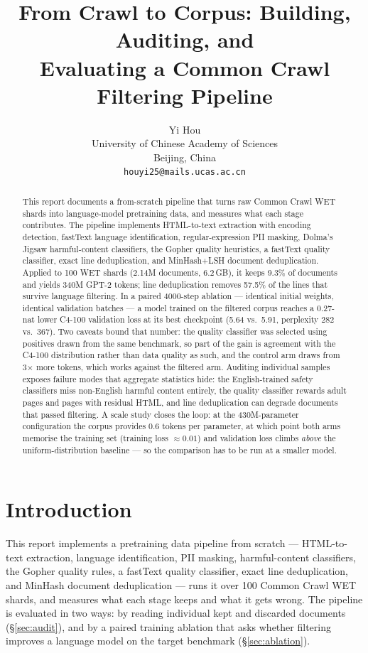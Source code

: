 \documentclass{article}
\title{From Crawl to Corpus: Building, Auditing, and\\
Evaluating a Common Crawl Filtering Pipeline}
\author{%
  Yi Hou \\
  University of Chinese Academy of Sciences\\
  Beijing, China \\
  \texttt{houyi25@mails.ucas.ac.cn}
}
\begin{document}
\maketitle

\begin{abstract}
This report documents a from-scratch pipeline that turns raw Common Crawl WET shards into
language-model pretraining data, and measures what each stage contributes. The pipeline
implements HTML-to-text extraction with encoding detection, fastText language identification,
regular-expression PII masking, Dolma's Jigsaw harmful-content classifiers, the Gopher quality
heuristics, a fastText quality classifier, exact line deduplication, and MinHash+LSH document
deduplication. Applied to 100 WET shards (2.14M documents, 6.2\,GB), it keeps 9.3\% of
documents and yields 340M GPT-2 tokens; line deduplication removes 57.5\% of the lines that
survive language filtering. In a paired 4000-step ablation --- identical initial weights,
identical validation batches --- a model trained on the filtered corpus reaches a 0.27-nat
lower C4-100 validation loss at its best checkpoint (5.64 vs.\ 5.91, perplexity 282 vs.\ 367).
Two caveats bound that number: the quality classifier was selected using positives drawn from
the same benchmark, so part of the gain is agreement with the C4-100 distribution rather than
data quality as such, and the control arm draws from 3$\times$ more tokens, which works
against the filtered arm. Auditing individual samples exposes failure modes that aggregate
statistics hide: the English-trained safety classifiers miss non-English harmful content
entirely, the quality classifier rewards adult pages and pages with residual HTML, and line
deduplication can degrade documents that passed filtering. A scale study closes the loop: at
the 430M-parameter configuration the corpus provides 0.6 tokens per parameter, at
which point both arms memorise the training set (training loss $\approx 0.01$) and validation
loss climbs \emph{above} the uniform-distribution baseline --- so the comparison has to be run
at a smaller model.
\end{abstract}

\section{Introduction}

This report implements a pretraining data pipeline from scratch --- HTML-to-text extraction,
language identification, PII masking, harmful-content classifiers, the Gopher quality rules,
a fastText quality classifier, exact line deduplication, and MinHash document deduplication ---
runs it over 100 Common Crawl WET shards, and measures what each stage keeps and what it gets
wrong. The pipeline is evaluated in two ways: by reading individual kept and discarded
documents (§\ref{sec:audit}), and by a paired training ablation that asks whether filtering
improves a language model on the target benchmark (§\ref{sec:ablation}).
\end{document}
